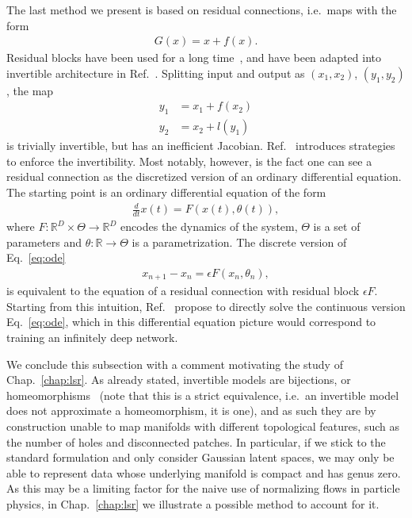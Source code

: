 The last method we present is based on residual connections, i.e.\  maps with the form
%
\begin{align}
G(x) = x + f(x).
\end{align}
%
Residual blocks have been used for a long time~\cite{he2015deep}, and have been adapted into invertible architecture in Ref.~\cite{gomez2017reversible, jacobsen2018irevnet}. Splitting input and output as $(x_1, x_2)$, $(y_1, y_2)$, the map
%
\begin{align}
y_1 &= x_1 + f(x_2)\\
y_2 &= x_2 + l(y_1)
\end{align}
%
is trivially invertible, but has an inefficient Jacobian. Ref.~\cite{gomez2017reversible, jacobsen2018irevnet} introduces
strategies to enforce the invertibility.
Most notably, however, is the fact one can see a residual connection as the discretized 
version of an ordinary differential equation. 
The starting point is an ordinary differential equation of the form
%
\begin{align}\label{eq:ode}
\frac{d}{dt}x(t) = F(x(t), \theta(t)),
\end{align}
%
where $F : \mathbb{R}^D \times \Theta \rightarrow \mathbb{R}^D$ encodes the dynamics of the system, $\Theta$ is a set of parameters and $\theta : \mathbb{R} \rightarrow \Theta$ is a parametrization.
The discrete version of Eq.~\ref{eq:ode} 
%
\begin{align}
x_{n+1} - x_n = \epsilon F(x_n, \theta_n), 
\end{align}
%
is equivalent to the equation of a residual connection with residual block $\epsilon F$.
Starting from this intuition, Ref.~\cite{dupont2019augmented, chen2019neural , grathwohl2018ffjord} 
propose to directly solve the continuous version Eq.~\ref{eq:ode}, which in this differential equation picture 
would correspond to training an infinitely deep network.

\medskip

We conclude this subsection with a comment motivating the study of Chap.~\ref{chap:lsr}. As already stated, invertible models are bijections, or homeomorphisms~\cite{dupont2019augmented,  huang2020augmented} (note that this is a strict equivalence, i.e.\   an invertible model does not approximate a homeomorphism, it is one), and as such they are by construction unable to map manifolds with different topological features, such as the number of holes and disconnected patches. In particular, if we stick to the standard formulation and only consider Gaussian latent spaces, we may only be able to represent data whose underlying manifold is compact and has genus zero. As this may be a limiting factor for the naive use of normalizing flows in particle physics, in Chap.~\ref{chap:lsr} we illustrate a possible method to account for it.

